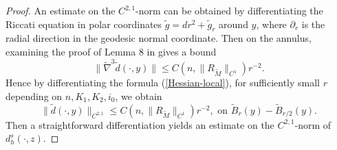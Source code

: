 \documentclass[11pt,letterpaper]{amsart}
\numberwithin{equation}{section}
\theoremstyle{definition}
\theoremstyle{plain}
\theoremstyle{definition}
\theoremstyle{plain}
\theoremstyle{definition}
\theoremstyle{plain}
\begin{document}
\begin{proof}
An estimate on the $C^{2,1}$-norm can be obtained by differentiating the Riccati equation in polar coordinates $\widetilde{g}=dr^2+\widetilde{g}_r$ around $y$, where $\partial_r$ is the radial direction in the geodesic normal coordinate.
Then on the annulus, examining the proof of Lemma 8 in \cite{HV} gives a bound
$$\|\widetilde{\nabla}^3\widetilde{d}(\cdot,y)\|\leqslant C(n, \|R_{\widetilde{M}}\|_{C^1})r^{-2}.$$
Hence by differentiating the formula (\ref{Hessian-local}), for sufficiently small $r$ depending on $n,K_1,K_2,i_0$, we obtain
\begin{equation}\label{dC21}
\|\widetilde{d}(\cdot,y)\|_{C^{2,1}}\leqslant C(n, \|R_{\widetilde{M}}\|_{C^1})r^{-2},\textrm{ on } \widetilde{B}_{r}(y)-\widetilde{B}_{r/2}(y).
\end{equation}
Then a straightforward differentiation yields an estimate on the $C^{2,1}$-norm of $d_h^s(\cdot,z)$.
\end{proof}
\end{document}
